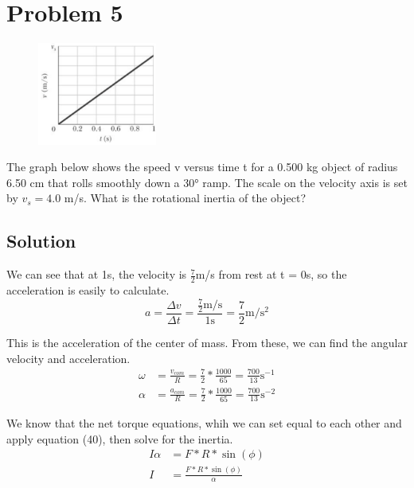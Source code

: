 \documentclass[12pt]{article}
\begin{document}
\section{Problem 5}
\begin{figure}
    \vspace{-30pt}
    \includegraphics[width=0.35\textwidth]{graph_5.png} 
\end{figure}
The graph below shows the speed v versus time t for a 0.500 kg object of radius 6.50 cm that rolls smoothly down a 30\unit{\degree} ramp. The scale on the velocity axis is set by $v_s = 4.0$ m/s. What is the rotational inertia of the object?

\subsection{Solution}
We can see that at 1s, the velocity is $\frac{7}{2}$m/s from rest at t = 0s, so the acceleration is easily to calculate.
\begin{equation}
    a = \frac{\Delta v}{\Delta t} = \frac{\frac{7}{2}\unit{\meter/\second}}{1\unit{\second}} = \frac{7}{2}\unit{\meter/\second^2}
\end{equation}

This is the acceleration of the center of mass. From these, we can find the angular velocity and acceleration.
\begin{align}
    \omega  &=  \frac{v_{com}}{R}
        =   \frac{7}{2}*\frac{1000}{65}
        =   \frac{700}{13}\unit{\second^{-1}}\\
    \alpha  &=  \frac{a_{com}}{R}
        =   \frac{7}{2}*\frac{1000}{65}
        =   \frac{700}{13}\unit{\second^{-2}}
\end{align}

We know that the net torque equations, whih we can set equal to each other and apply equation (40), then solve for the inertia.
\begin{align}
    I\alpha &=  F*R*\sin(\phi)\\
    I   &=  \frac{F*R*\sin(\phi)}{\alpha}
\end{align}
\end{document}
